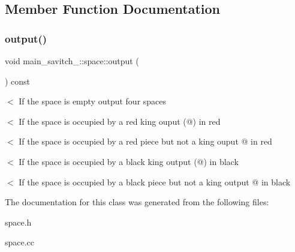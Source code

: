 \subsection{Member Function Documentation}
\mbox{\label{classmain__savitch__14_1_1space_ae84e9dcd39558b5555ead492bd0e3090}} 
\subsubsection{\texorpdfstring{output()}{output()}}
{\footnotesize\ttfamily void main\+\_\+savitch\+\_\+::space\+::output (\begin{DoxyParamCaption}{ }\end{DoxyParamCaption}) const}

$<$ If the space is empty output four spaces

$<$ If the space is occupied by a red king ouput (@) in red

$<$ If the space is occupied by a red piece but not a king ouput @ in red

$<$ If the space is occupied by a black king output (@) in black

$<$ If the space is occupied by a black piece but not a king output @ in black 

The documentation for this class was generated from the following files\+:\begin{DoxyCompactItemize}
\item 
space.\+h\item 
space.\+cc\end{DoxyCompactItemize}
